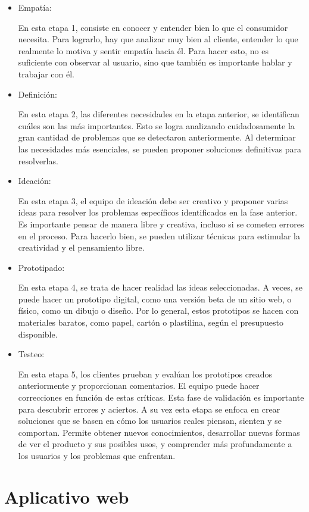 \documentclass[hidelinks]{Documento}
\begin{document}
\begin{itemize}
    \item Empatía:
    
    En esta etapa 1, consiste en conocer y entender bien lo que el consumidor necesita. Para lograrlo, hay que analizar muy bien al cliente, entender lo que realmente lo motiva y sentir empatía hacia él. Para hacer esto, no es suficiente con observar al usuario, sino que también es importante hablar y trabajar con él.
    \item Definición:

    En esta etapa 2, las diferentes necesidades en la etapa anterior, se identifican cuáles son las más importantes. Esto se logra analizando cuidadosamente la gran cantidad de problemas que se detectaron anteriormente. Al determinar las necesidades más esenciales, se pueden proponer soluciones definitivas para resolverlas.
    \item Ideación:

    En esta etapa 3, el equipo de ideación debe ser creativo y proponer varias ideas para resolver los problemas específicos identificados en la fase anterior. Es importante pensar de manera libre y creativa, incluso si se cometen errores en el proceso. Para hacerlo bien, se pueden utilizar técnicas para estimular la creatividad y el pensamiento libre. 
    \item Prototipado:

    En esta etapa 4, se trata de hacer realidad las ideas seleccionadas. A veces, se puede hacer un prototipo digital, como una versión beta de un sitio web, o físico, como un dibujo o diseño. Por lo general, estos prototipos se hacen con materiales baratos, como papel, cartón o plastilina, según el presupuesto disponible.
    \item Testeo:

    En esta etapa 5, los clientes prueban y evalúan los prototipos creados anteriormente y proporcionan comentarios. El equipo puede hacer correcciones en función de estas críticas. Esta fase de validación es importante para descubrir errores y aciertos. A su vez esta etapa se enfoca en crear soluciones que se basen en cómo los usuarios reales piensan, sienten y se comportan. Permite obtener nuevos conocimientos, desarrollar nuevas formas de ver el producto y sus posibles usos, y comprender más profundamente a los usuarios y los problemas que enfrentan.

\end{itemize}

\section{Aplicativo web}
\end{document}
